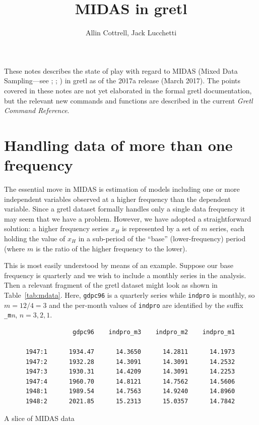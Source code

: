 \documentclass{article}
\begin{document}
\setlength{\parindent}{0pt}
\setlength{\parskip}{1ex}

\title{MIDAS in gretl}
\author{Allin Cottrell, Jack Lucchetti}

\maketitle

These notes describes the state of play with regard to MIDAS (Mixed
Data Sampling---see \citealp{ghysels04}; \citealp{ghysels15};
\citealp{armesto10}) in gretl as of the 2017a release (March
2017). The points covered in these notes are not yet elaborated in the
formal gretl documentation, but the relevant new commands and
functions are described in the current \textit{Gretl Command
  Reference}.

\section{Handling data of more than one frequency}
\label{sec:data-basics}

The essential move in MIDAS is estimation of models including one or
more independent variables observed at a higher frequency than the
dependent variable. Since a gretl dataset formally handles only a
single data frequency it may seem that we have a problem. However, we
have adopted a straightforward solution: a higher frequency series
$x_H$ is represented by a set of $m$ series, each holding the value of
$x_H$ in a sub-period of the ``base'' (lower-frequency) period (where
$m$ is the ratio of the higher frequency to the lower).

This is most easily understood by means of an example. Suppose our
base frequency is quarterly and we wish to include a monthly series in
the analysis. Then a relevant fragment of the gretl dataset might look
as shown in Table~\ref{tab:mdata}. Here, \texttt{gdpc96} is a
quarterly series while \texttt{indpro} is monthly, so $m=12/4=3$ and
the per-month values of \texttt{indpro} are identified by the suffix
\verb|_m|\textit{n}, $n=3,2,1$.

\begin{table}[h]
\small
\begin{verbatim}
                   gdpc96    indpro_m3    indpro_m2    indpro_m1

      1947:1      1934.47      14.3650      14.2811      14.1973
      1947:2      1932.28      14.3091      14.3091      14.2532
      1947:3      1930.31      14.4209      14.3091      14.2253
      1947:4      1960.70      14.8121      14.7562      14.5606
      1948:1      1989.54      14.7563      14.9240      14.8960
      1948:2      2021.85      15.2313      15.0357      14.7842
\end{verbatim}
  \caption{A slice of MIDAS data}
  \label{tab:mdata}
\end{table}
\end{document}
